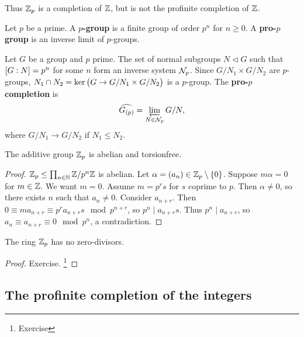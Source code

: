 Thus $ \mathbb{Z}_p $ is a completion of $ \mathbb{Z} $, but is not the profinite completion of $ \mathbb{Z} $.

\begin{definition}
Let $ p $ be a prime. A \textbf{$ p $-group} is a finite group of order $ p^n $ for $ n \ge 0 $. A \textbf{pro-$ p $ group} is an inverse limit of $ p $-groups.
\end{definition}

\begin{definition}
Let $ G $ be a group and $ p $ prime. The set of normal subgroups $ N \triangleleft G $ such that $ \sbr{G : N} = p^n $ for some $ n $ form an inverse system $ \mathcal{N}_p $. Since $ G / N_1 \times G / N_2 $ are $ p $-groups, $ N_1 \cap N_2 = \ker \br{G \to G / N_1 \times G / N_2} $ is a $ p $-group. The \textbf{pro-$ p $ completion} is
$$ \widehat{G_{\br{p}}} = \varprojlim_{N \in \NNN_p} G / N, $$
where $ G / N_1 \to G / N_2 $ if $ N_1 \le N_2 $.
\end{definition}

\begin{proposition}
The additive group $ \mathbb{Z}_p $ is abelian and torsionfree.
\end{proposition}

\begin{proof}
$ \mathbb{Z}_p \le \prod_{n \in \mathbb{N}} \mathbb{Z} / p^n\mathbb{Z} $ is abelian. Let $ \alpha = \br{a_n} \in \ZZ_p \setminus \cbr{0} $. Suppose $ m\alpha = 0 $ for $ m \in \mathbb{Z} $. We want $ m = 0 $. Assume $ m = p^rs $ for $ s $ coprime to $ p $. Then $ \alpha \ne 0 $, so there exists $ n $ such that $ a_n \ne 0 $. Consider $ a_{n + r} $. Then $ 0 \equiv ma_{n + r} \equiv p^ra_{n + r}s \mod p^{n + r} $, so $ p^n \mid a_{n + r}s $. Thus $ p^n \mid a_{n + r} $, so $ a_n \equiv a_{n + r} \equiv 0 \mod p^n $, a contradiction.
\end{proof}

\pagebreak

\begin{proposition}
The ring $ \mathbb{Z}_p $ has no zero-divisors.
\end{proposition}

\begin{proof}
Exercise. \footnote{Exercise}
\end{proof}

\subsection{The profinite completion of the integers}

